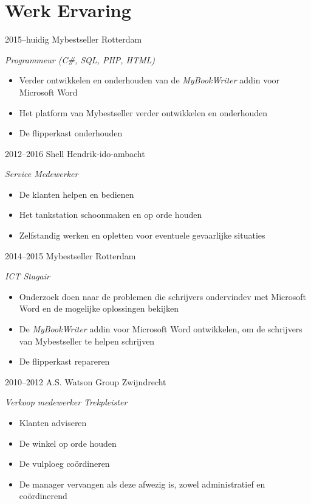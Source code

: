 \documentclass[]{friggeri-cv} %
\begin{document}
\clearpage

\section{Werk Ervaring}

\begin{entrylist}
   \entry
   {2015--huidig}
   {Mybestseller}
   {Rotterdam}
   {\emph{Programmeur (C\#, SQL, PHP, HTML)}
      \begin{itemize}
         \item Verder ontwikkelen en onderhouden van de \textit{MyBookWriter} addin voor Microsoft Word
         \item Het platform van Mybestseller verder ontwikkelen en onderhouden
         \item De flipperkast onderhouden
      \end{itemize}
   }
   \entry
   {2012--2016}
   {Shell}
   {Hendrik-ido-ambacht}
   {\emph{Service Medewerker}
      \begin{itemize}
         \item De klanten helpen en bedienen
         \item Het tankstation schoonmaken en op orde houden
         \item Zelfstandig werken en opletten voor eventuele gevaarlijke situaties
      \end{itemize}
   }
   \entry
   {2014--2015}
   {Mybestseller}
   {Rotterdam}
   {\emph{ICT Stagair}
      \begin{itemize}
         \item Onderzoek doen naar de problemen die schrijvers ondervindev met Microsoft Word en de mogelijke oplossingen bekijken
         \item De \textit{MyBookWriter} addin voor Microsoft Word ontwikkelen, om de schrijvers van Mybestseller te helpen schrijven
         \item De flipperkast repareren
      \end{itemize}
   }
   \entry
   {2010--2012}
   {A.S. Watson Group}
   {Zwijndrecht}
   {\emph{Verkoop medewerker Trekpleister}
      \begin{itemize}
         \item Klanten adviseren
         \item De winkel op orde houden
         \item De vulploeg co\"ordineren
         \item De manager vervangen als deze afwezig is, zowel administratief en co\"ordinerend
      \end{itemize}
   }
\end{entrylist}
\end{document}
